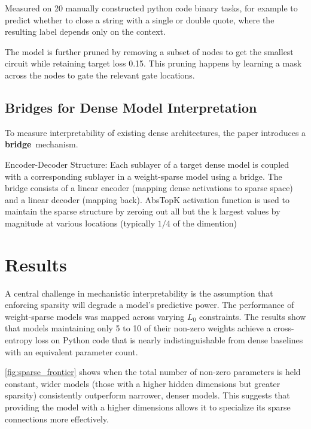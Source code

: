 \documentclass[a4paper,oneside,10pt,english]{scrartcl}
\begin{document}
Measured on 20 manually constructed python code binary tasks, for example to predict whether to close a string with a single or double quote, where the resulting label depends only on the context. \par

The model is further pruned by removing a subset of nodes to get the smallest circuit while retaining target loss 0.15. This pruning happens by learning a mask across the nodes to gate the relevant gate locations.


\subsection{Bridges for Dense Model Interpretation}

To measure interpretability of existing dense architectures, the paper introduces a \textbf{bridge}\ mechanism. \par

Encoder-Decoder Structure: Each sublayer of a target dense model is coupled with a corresponding sublayer in a weight-sparse model using a bridge. The bridge consists of a linear encoder (mapping dense activations to sparse space) and a linear decoder (mapping back). AbsTopK activation function is used to maintain the sparse structure by zeroing out all but the k largest values by magnitude at various locations (typically $1/4$ of the dimention) 

\section{Results}
\label{sec:results}

A central challenge in mechanistic interpretability is the assumption that enforcing sparsity will degrade a model’s predictive power. The performance of weight-sparse models was mapped across varying $L_0$ constraints. The results show that models maintaining only 5 to 10 of their non-zero weights achieve a cross-entropy loss on Python code that is nearly indistinguishable from dense baselines with an equivalent parameter count. \par

\autoref{fig:sparse_frontier} shows when the total number of non-zero parameters is held constant, wider models (those with a higher hidden dimensions but greater sparsity) consistently outperform narrower, denser models. This suggests that providing the model with a higher dimensions allows it to specialize its sparse connections more effectively.
\end{document}

